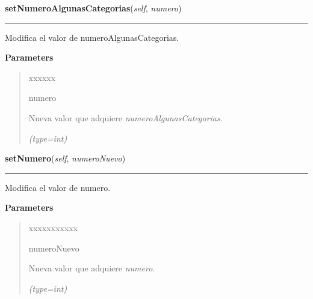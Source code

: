 \hspace{.8\funcindent}\begin{boxedminipage}{\funcwidth}

    \raggedright \textbf{setNumeroAlgunasCategorias}(\textit{self}, \textit{numero})

    \vspace{-1.5ex}

    \rule{\textwidth}{0.5\fboxrule}
\setlength{\parskip}{2ex}
    Modifica el valor de numeroAlgunasCategorias.

\setlength{\parskip}{1ex}
      \textbf{Parameters}
      \vspace{-1ex}

      \begin{quote}
        \begin{Ventry}{xxxxxx}

          \item[numero]

          Nueva valor que adquiere \textit{numeroAlgunasCategorias}.

            {\it (type=int)}

        \end{Ventry}

      \end{quote}

    \end{boxedminipage}

    \label{grafico:Grafico:setNumero}

    \vspace{0.5ex}

\hspace{.8\funcindent}\begin{boxedminipage}{\funcwidth}

    \raggedright \textbf{setNumero}(\textit{self}, \textit{numeroNuevo})

    \vspace{-1.5ex}

    \rule{\textwidth}{0.5\fboxrule}
\setlength{\parskip}{2ex}
    Modifica el valor de numero.

\setlength{\parskip}{1ex}
      \textbf{Parameters}
      \vspace{-1ex}

      \begin{quote}
        \begin{Ventry}{xxxxxxxxxxx}

          \item[numeroNuevo]

          Nueva valor que adquiere \textit{numero}.

            {\it (type=int)}

        \end{Ventry}

      \end{quote}

    \end{boxedminipage}

